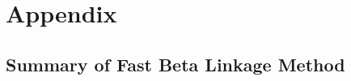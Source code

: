 \documentclass[12pt,letterpaper]{article}
\newcommand{\1}[1]{\mathbb{I}\!\left[#1\right]} %
\begin{document}

\clearpage

\section{Appendix}
\label{sec:appendix}

\hypertarget{app:fabl-psuedocode}{%
	\subsection{Summary of Fast Beta Linkage Method}\label{app:fabl-psuedocode}}
\end{document}
